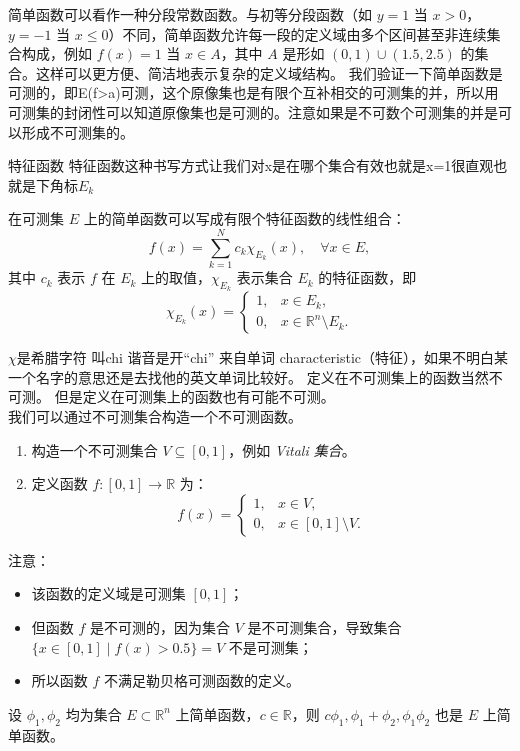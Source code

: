 \documentclass[lang=cn,10pt]{elegantbook}
\begin{document}
简单函数可以看作一种分段常数函数。与初等分段函数（如 $y=1$ 当 $x>0$，$y=-1$ 当 $x \leq 0$）不同，简单函数允许每一段的定义域由多个区间甚至非连续集合构成，例如 $f(x) = 1$ 当 $x \in A$，其中 $A$ 是形如 $(0,1) \cup (1.5, 2.5)$ 的集合。这样可以更方便、简洁地表示复杂的定义域结构。
我们验证一下简单函数是可测的，即E(f>a)可测，这个原像集也是有限个互补相交的可测集的并，所以用可测集的封闭性可以知道原像集也是可测的。注意如果是不可数个可测集的并是可以形成不可测集的。
\begin{definition}{特征函数}
    特征函数这种书写方式让我们对x是在哪个集合有效也就是x=1很直观也就是下角标$E_k$

在可测集 $E$ 上的简单函数可以写成有限个特征函数的线性组合：
\[
f(x) = \sum_{k=1}^{N} c_k \chi_{E_k}(x), \quad \forall x \in E,
\]
其中 $c_k$ 表示 $f$ 在 $E_k$ 上的取值，$\chi_{E_k}$ 表示集合 $E_k$ 的特征函数，即
\[
\chi_{E_k}(x) =
\begin{cases}
1, & x \in E_k, \\
0, & x \in \mathbb{R}^n \setminus E_k.
\end{cases}
\]
\end{definition}
$\chi$是希腊字符 叫chi 谐音是开“chi” 来自单词 characteristic（特征），如果不明白某一个名字的意思还是去找他的英文单词比较好。
定义在不可测集上的函数当然不可测。
但是定义在可测集上的函数也有可能不可测。\\
我们可以通过不可测集合构造一个不可测函数。
\begin{enumerate}
  \item 构造一个不可测集合 $V \subseteq [0,1]$，例如 \emph{Vitali 集合}。
  
  \item 定义函数 $f: [0,1] \to \mathbb{R}$ 为：
  \[
  f(x) = 
  \begin{cases}
  1, & x \in V, \\
  0, & x \in [0,1] \setminus V.
  \end{cases}
  \]
\end{enumerate}

注意：
\begin{itemize}
  \item 该函数的定义域是可测集 $[0,1]$；
  \item 但函数 $f$ 是不可测的，因为集合 $V$ 是不可测集合，导致集合 $\{x \in [0,1] \mid f(x) > 0.5\} = V$ 不是可测集；
  \item 所以函数 $f$ 不满足勒贝格可测函数的定义。
\end{itemize}
\begin{lemma}[简单函数封闭性]
设 $\phi_1, \phi_2$ 均为集合 $E \subset \mathbb{R}^n$ 上简单函数，$c \in \mathbb{R}$，则 $c\phi_1, \phi_1 + \phi_2, \phi_1\phi_2$ 也是 $E$ 上简单函数。
\end{lemma}
\end{document}
